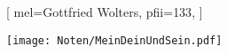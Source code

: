 [
    mel={Gottfried Wolters},
	pfii={133},
]

\texttt{[image: Noten/MeinDeinUndSein.pdf]}

\endsong
